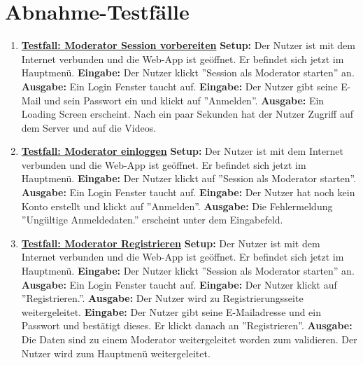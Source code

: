 \section{Abnahme-Testfälle}
\begin{enumerate}
	\item \underline{\textbf{Testfall: Moderator Session vorbereiten}} \linebreak
	\textbf{Setup:} Der Nutzer ist mit dem Internet verbunden und die Web-App ist geöffnet. Er befindet sich jetzt im Hauptmenü.\linebreak
	\textbf{Eingabe:} Der Nutzer klickt ''Session als Moderator starten'' an.\linebreak
	\textbf{Ausgabe:} Ein Login Fenster taucht auf.\linebreak
	\textbf{Eingabe:} Der Nutzer gibt seine E-Mail und sein Passwort ein und klickt auf ''Anmelden''.\linebreak
	\textbf{Ausgabe:} Ein Loading Screen erscheint. Nach ein paar Sekunden hat der Nutzer Zugriff auf dem Server und auf die Videos.
	
	\item \underline{\textbf{Testfall: Moderator einloggen}} \linebreak
	\textbf{Setup:} Der Nutzer ist mit dem Internet verbunden und die Web-App ist geöffnet. Er befindet sich jetzt im Hauptmenü. \linebreak
	\textbf{Eingabe:} Der Nutzer klickt auf ''Session als Moderator starten''. \linebreak
	\textbf{Ausgabe:} Ein Login Fenster taucht auf.\linebreak
	\textbf{Eingabe:} Der Nutzer hat noch kein Konto erstellt und klickt auf ''Anmelden''.\linebreak
	\textbf{Ausgabe:} Die Fehlermeldung ''Ungültige Anmeldedaten.'' erscheint unter dem Eingabefeld.
	
	\item \underline{\textbf{Testfall: Moderator Registrieren}} \linebreak
	\textbf{Setup:} Der Nutzer ist mit dem Internet verbunden und die Web-App ist geöffnet. Er befindet sich jetzt im Hauptmenü.\linebreak
	\textbf{Eingabe:} Der Nutzer klickt ''Session als Moderator starten'' an. \linebreak
	\textbf{Ausgabe:} Ein Login Fenster taucht auf.\linebreak
	\textbf{Eingabe:} Der Nutzer klickt auf ''Registrieren.''.\linebreak
	\textbf{Ausgabe:} Der Nutzer wird zu Registrierungsseite weitergeleitet.\linebreak
	\textbf{Eingabe:} Der Nutzer gibt seine E-Mailadresse und ein Passwort und bestätigt dieses. Er klickt danach an ''Registrieren''. \linebreak
	\textbf{Ausgabe:} Die Daten sind zu einem Moderator weitergeleitet worden zum validieren.  Der Nutzer wird zum Hauptmenü weitergeleitet.
	

\end{enumerate}
